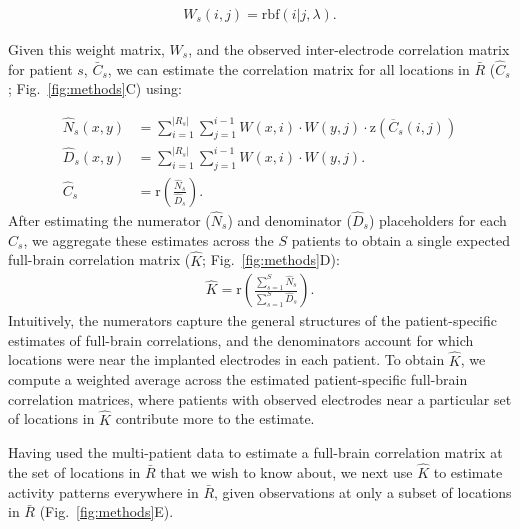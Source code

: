 \documentclass[10pt]{article}
\providecommand{\DIFaddtex}[1]{{\protect\color{blue}\uwave{#1}}} %
\providecommand{\DIFdeltex}[1]{{\protect\color{red}\sout{#1}}}                      %
\providecommand{\DIFaddbegin}{} %
\providecommand{\DIFaddend}{} %
\providecommand{\DIFdelbegin}{} %
\providecommand{\DIFdelend}{} %
\providecommand{\DIFadd}[1]{\texorpdfstring{\DIFaddtex{#1}}{#1}} %
\providecommand{\DIFdel}[1]{\texorpdfstring{\DIFdeltex{#1}}{}} %
\newcommand{\DIFscaledelfig}{0.5}
\newlength{\DIFdelgraphicswidth} %
\newlength{\DIFdelgraphicsheight} %
\newcommand{\DIFaddincludegraphics}[2][]{{\color{blue}\fbox{\DIFOincludegraphics[#1]{#2}}}} %
\newcommand{\DIFdelincludegraphics}[2][]{%
\sbox{\DIFdelgraphicsbox}{\DIFOincludegraphics[#1]{#2}}%
\settoboxwidth{\DIFdelgraphicswidth}{\DIFdelgraphicsbox} %
\settoboxtotalheight{\DIFdelgraphicsheight}{\DIFdelgraphicsbox} %
\scalebox{\DIFscaledelfig}{%
\parbox[b]{\DIFdelgraphicswidth}{\usebox{\DIFdelgraphicsbox}\\[-\baselineskip] \rule{\DIFdelgraphicswidth}{0em}}\llap{\resizebox{\DIFdelgraphicswidth}{\DIFdelgraphicsheight}{%
\setlength{\unitlength}{\DIFdelgraphicswidth}%
\begin{picture}(1,1)%
\thicklines\linethickness{2pt} %
{\color[rgb]{1,0,0}\put(0,0){\framebox(1,1){}}}%
{\color[rgb]{1,0,0}\put(0,0){\line( 1,1){1}}}%
{\color[rgb]{1,0,0}\put(0,1){\line(1,-1){1}}}%
\end{picture}%
}\hspace*{3pt}}} %
} %
\DeclareRobustCommand{\DIFaddbegin}{\DIFOaddbegin \let\includegraphics\DIFaddincludegraphics} %
\DeclareRobustCommand{\DIFaddend}{\DIFOaddend \let\includegraphics\DIFOincludegraphics} %
\DeclareRobustCommand{\DIFdelbegin}{\DIFOdelbegin \let\includegraphics\DIFdelincludegraphics} %
\DeclareRobustCommand{\DIFdelend}{\DIFOaddend \let\includegraphics\DIFOincludegraphics} %
\begin{document}
\begin{align}
W_s(i, j) = \mathrm{rbf}(i|j,\lambda)\label{eqn:weight_matrix}.
\end{align}

Given this weight matrix, $W_s$, and the observed inter-electrode correlation
matrix for patient $s$, \DIFdelbegin \DIFdel{$\bar{C}_{s}$}\DIFdelend \DIFaddbegin \DIFadd{$\overline{C}_{s}$}\DIFaddend , we can estimate the correlation matrix
for all locations in \DIFdelbegin \DIFdel{$\bar{R}$ }\DIFdelend \DIFaddbegin \DIFadd{$\overline{R}$ }\DIFaddend ($\hat{C}_s$; Fig.~\ref{fig:methods}C) using:

\begin{align}
\hat{N}_{s}(x,y) & = { \sum_{i = 1}^{| R_{s}|}\sum_{j=1}^{i-1} W(x,i) \cdot W(y,j)\cdot \mathrm{z}(\DIFdelbegin %
\DIFdelend \DIFaddbegin \overline{C}\DIFaddend _{s}(i,j))}\label{eqn:subj_corrmat_num}\\
 \hat{D}_{s}(x,y) & = \sum_{i = 1}^{| R_{s}|}\sum_{j=1}^{i-1} W(x,i)
                    \cdot W(y,j). \label{eqn:subj_corrmat_den}\\
 \hat{C}_s &= \mathrm{r}\left( \frac{\hat{N}_{s}}{\hat{D}_{s}} \right)
             \label{eqn:subj_corrmat}.
\end{align}
After estimating the numerator ($\hat{N}_{s}$) and denominator
($\hat{D}_{s}$) placeholders for each $\hat{C}_{s}$, we aggregate these
estimates across the $S$ patients to obtain a single expected full-brain
correlation matrix ($\hat{K}$; Fig.~\ref{fig:methods}D):
\begin{align}
 \hat{K} = \mathrm{r} \left(  \frac{\sum_{s=1}^S  \hat{N}_{s}}{\sum_{s=1}^S \hat{D}_{s}}\right).\label{eqn:corrmat}
\end{align}
Intuitively, the numerators capture the general structures of the
patient-specific estimates of full-brain correlations, and the
denominators account for which locations were near the implanted
electrodes in each patient.  To obtain $\hat{K}$, we compute a
weighted average across the estimated patient-specific full-brain
correlation matrices, where patients with observed electrodes near a
particular set of locations in $\hat{K}$ contribute more to the
estimate.

Having used the multi-patient data to estimate a full-brain correlation matrix
at the set of locations in \DIFdelbegin \DIFdel{$\bar{R}$ }\DIFdelend \DIFaddbegin \DIFadd{$\overline{R}$ }\DIFaddend that we wish to know about, we next use
$\hat{K}$ to estimate activity patterns everywhere in \DIFdelbegin \DIFdel{$\bar{R}$}\DIFdelend \DIFaddbegin \DIFadd{$\overline{R}$}\DIFaddend , given
observations at only a subset of locations in \DIFdelbegin \DIFdel{$\bar{R}$ }\DIFdelend \DIFaddbegin \DIFadd{$\overline{R}$
}\DIFaddend (Fig.~\ref{fig:methods}E).
\end{document}

